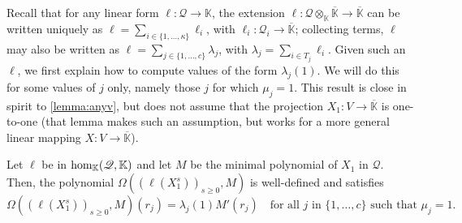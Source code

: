 \documentclass[12pt]{article}
\newcommand{\lf}{X}
\newcommand{\residueI}{\mathscr{Q}}
\def\dg{\kappa}
\def\K{\mathbb{K}}
\def\K {\ensuremath{\mathbb{K}}}
\def\Kbar {{\ensuremath{\overline{\mathbb{K}}}}}
\begin{document}
Recall that for any linear form $\ell: \residueI \to \K$, the
extension $\ell: \residueI\otimes_\K \Kbar \to \Kbar$ can be written
uniquely as $\ell=\sum_{i\in \{1,\dots,\dg\}} \ell_i$, with
$\ell_i:\residueI_i \to \Kbar$; collecting terms, $\ell$ may also be
written as $\ell=\sum_{j \in \{1,\dots,c\}} \lambda_j$, with
$\lambda_j=\sum_{i \in T_j} \ell_i$.  Given such an $\ell$, we first
explain how to compute values of the form $\lambda_j(1)$. We will do
this for some values of $j$ only, namely those $j$ for which
$\mu_j=1$. This result is close in spirit to \cref{lemma:anyv}, but
does not assume that the projection $X_1: V \to \Kbar$ is one-to-one
(that lemma makes such an assumption, but works for a more general
linear mapping $\lf:V\to \Kbar$).

\begin{lemma}\label{lemma:valuelambda}
  Let $\ell$ be in ${\rm hom}_\K(\residueI,\K)$ and let $M$ be the minimal
  polynomial of $X_1$ in $\residueI$. Then, the polynomial
  $\Omega((\ell(X_1^s))_{s\ge0},M)$ is well-defined and satisfies
  $$\Omega((\ell(X_1^s))_{s\ge0},M)(r_j) = \lambda_j(1) M'(r_j) \quad \text{for all $j$ in $\{1,\dots,c\}$ such that $\mu_j=1$.}$$
\end{lemma}
\end{document}
